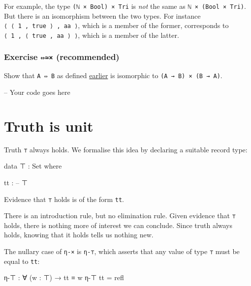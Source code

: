 For example, the type \texttt{(ℕ\ ×\ Bool)\ ×\ Tri} is \emph{not} the
same as \texttt{ℕ\ ×\ (Bool\ ×\ Tri)}. But there is an isomorphism
between the two types. For instance
\texttt{⟨\ ⟨\ 1\ ,\ true\ ⟩\ ,\ aa\ ⟩}, which is a member of the former,
corresponds to \texttt{⟨\ 1\ ,\ ⟨\ true\ ,\ aa\ ⟩\ ⟩}, which is a member
of the latter.

\hypertarget{exercise-recommended}{%
\subsubsection{\texorpdfstring{Exercise \texttt{⇔≃×}
(recommended)}{Exercise ⇔≃× (recommended)}}\label{exercise-recommended}}

Show that \texttt{A\ ⇔\ B} as defined
\protect\hyperlink{Isomorphism-iff}{earlier} is isomorphic to
\texttt{(A\ →\ B)\ ×\ (B\ →\ A)}.

\begin{fence}
\begin{code}
-- Your code goes here
\end{code}
\end{fence}

\hypertarget{truth-is-unit}{%
\section{Truth is unit}\label{truth-is-unit}}

Truth \texttt{⊤} always holds. We formalise this idea by declaring a
suitable record type:

\begin{fence}
\begin{code}
data ⊤ : Set where

  tt :
    --
    ⊤
\end{code}
\end{fence}

Evidence that \texttt{⊤} holds is of the form \texttt{tt}.

There is an introduction rule, but no elimination rule. Given evidence
that \texttt{⊤} holds, there is nothing more of interest we can
conclude. Since truth always holds, knowing that it holds tells us
nothing new.

The nullary case of \texttt{η-×} is \texttt{η-⊤}, which asserts that any
value of type \texttt{⊤} must be equal to \texttt{tt}:

\begin{fence}
\begin{code}
η-⊤ : ∀ (w : ⊤) → tt ≡ w
η-⊤ tt = refl
\end{code}
\end{fence}

